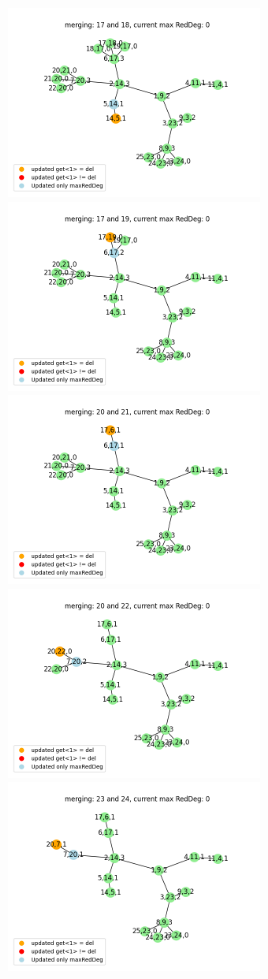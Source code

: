 \documentclass[10pt]{article}
\begin{document}
\includegraphics[width=0.5\textwidth]{images/merge5.png}
\includegraphics[width=0.5\textwidth]{images/merge6.png}
\includegraphics[width=0.5\textwidth]{images/merge7.png}
\includegraphics[width=0.5\textwidth]{images/merge8.png}
\includegraphics[width=0.5\textwidth]{images/merge9.png}
\end{document}
